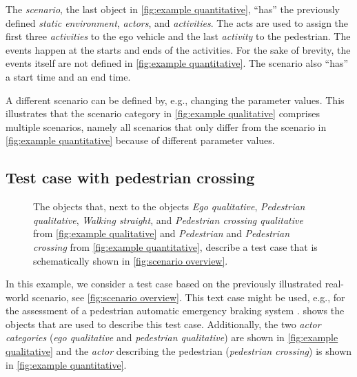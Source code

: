 The \textit{scenario}, the last object in \cref{fig:example quantitative}, ``has'' the previously defined \textit{static environment}, \textit{actors}, and \textit{activities}. The acts are used to assign the first three \textit{activities} to the ego vehicle and the last \textit{activity} to the pedestrian. The events happen at the starts and ends of the activities. For the sake of brevity, the events itself are not defined in \cref{fig:example quantitative}. The scenario also ``has'' a start time and an end time.

\cstart A different scenario can be defined by, e.g., changing the parameter values. This illustrates that the scenario category in \cref{fig:example qualitative} comprises multiple scenarios, namely all scenarios that only differ from the scenario in \cref{fig:example quantitative} because of different parameter values.\cend

\subsection{Test case with pedestrian crossing}
\label{sec:example test case}


\begin{figure}
	\centering
	
	\caption{The objects that, next to the objects \emph{Ego qualitative}, \emph{Pedestrian qualitative}, \emph{Walking straight}, and \emph{Pedestrian crossing qualitative} from \cref{fig:example qualitative} and \emph{Pedestrian} and \emph{Pedestrian crossing} from \cref{fig:example quantitative}, describe a test case that is schematically shown in \cref{fig:scenario overview}.}
	\label{fig:example test case}
\end{figure}


In this example, we consider a test case based on the previously illustrated real-world scenario, see \cref{fig:scenario overview}. This text case might be used, e.g., for the assessment of a pedestrian automatic emergency braking system \autocite{seiniger2015test}.  shows the objects that are used to describe this test case. Additionally, the two \textit{actor categories} (\emph{ego qualitative} and \emph{pedestrian qualitative}) are shown in \cref{fig:example qualitative} and the \textit{actor} describing the pedestrian (\emph{pedestrian crossing}) is shown in \cref{fig:example quantitative}.



